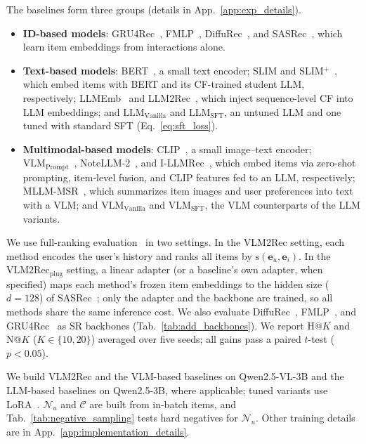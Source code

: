 \vspace{+0.1cm}
The baselines form three groups (details in App.~\ref{app:exp_details}).
\begin{itemize}[wide=0pt]
    \item \textbf{ID-based models}: GRU4Rec~\cite{gru4rec}, FMLP~\cite{fmlp}, DiffuRec~\cite{diffurec}, and SASRec~\cite{sasrec}, which learn item embeddings from interactions alone.
    \item \textbf{Text-based models}: BERT~\cite{bert}, a small text encoder; SLIM and SLIM$^{+}$~\cite{slim}, which embed items with BERT and its CF-trained student LLM, respectively; LLMEmb~\cite{llmemb} and LLM2Rec~\cite{llm2rec}, which inject sequence-level CF into LLM embeddings; and $\text{LLM}_{\text{Vanilla}}$ and $\text{LLM}_{\text{SFT}}$, an untuned LLM and one tuned with standard SFT (Eq.~\ref{eq:sft_loss}).
    \item \textbf{Multimodal-based models}: CLIP~\cite{clip}, a small image--text encoder; $\text{VLM}_{\text{Prompt}}$~\cite{vlm_prompt}, NoteLLM-2~\cite{notellm2}, and I-LLMRec~\cite{illmrec}, which embed items via zero-shot prompting, item-level fusion, and CLIP features fed to an LLM, respectively; MLLM-MSR~\cite{mllmmsr}, which summarizes item images and user preferences into text with a VLM; and $\text{VLM}_{\text{Vanilla}}$ and $\text{VLM}_{\text{SFT}}$, the VLM counterparts of the LLM variants.
\end{itemize}

\vspace{+0.1cm}
We use full-ranking evaluation~\cite{negative_sampling} in two settings.
In the VLM2Rec setting, each method encodes the user's history and ranks all items by $\text{s}(\mathbf{e}_u,\mathbf{e}_i)$.
In the $\text{VLM2Rec}_{\text{plug}}$ setting, a linear adapter (or a baseline's own adapter, when specified) maps each method's frozen item embeddings to the hidden size ($d{=}128$) of SASRec~\cite{sasrec}; only the adapter and the backbone are trained, so all methods share the same inference cost.
We also evaluate DiffuRec~\cite{diffurec}, FMLP~\cite{fmlp}, and GRU4Rec~\cite{gru4rec} as SR backbones (Tab.~\ref{tab:add_backbones}).
We report H@$K$ and N@$K$ ($K \in \{10,20\}$) averaged over five seeds; all gains pass a paired $t$-test ($p<0.05$).


\vspace{+0.1cm}
 We build VLM2Rec and the VLM-based baselines on Qwen2.5-VL-3B and the LLM-based baselines on Qwen2.5-3B, where applicable; tuned variants use LoRA~\cite{lora}.
$\mathcal{N}_u$ and $\mathcal{C}$ are built from in-batch items, and Tab.~\ref{tab:negative_sampling} tests hard negatives for $\mathcal{N}_u$.
Other training details are in App.~\ref{app:implementation_details}.

